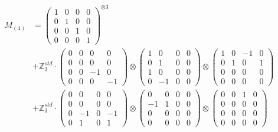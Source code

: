 \documentclass{article}
\newcommand{\Mthree}{%
    M_{(4)}
}
\begin{document}
        \footnotesize{
        \begin{align}
        \Mthree
        &= \label{Rs1-Rc16-Solution-3-c1} \begin{pmatrix} 1 & 0 & 0 & 0 \\ 0 & 1 & 0 & 0 \\ 0 & 0 & 1 & 0 \\ 0 & 0 & 0 & 1 \end{pmatrix}^{\otimes 3} \\
        &+ \label{Rs1-Rc16-Solution-3-c2} \mathbb{Z}_3^{std} \cdot 
            \begin{pmatrix} 0 & 0 & 0 & 0 \\ 0 & 0 & 0 & 0 \\ 0 & 0 & -1 & 0 \\ 0 & 0 & 0 & -1 \end{pmatrix} \otimes 
            \begin{pmatrix} 1 & 0 & 0 & 0 \\ 0 & 1 & 0 & 0 \\ 1 & 0 & 0 & 0 \\ 0 & -1 & 0 & 0 \end{pmatrix} \otimes 
            \begin{pmatrix} 1 & 0 & -1 & 0 \\ 0 & 1 & 0 & 1 \\ 0 & 0 & 0 & 0 \\ 0 & 0 & 0 & 0 \end{pmatrix} \\ 
        &+ \label{Rs1-Rc16-Solution-3-c3} \mathbb{Z}_3^{std} \cdot 
            \begin{pmatrix} 0 & 0 & 0 & 0 \\ 0 & 0 & 0 & 0 \\ 0 & -1 & 0 & -1 \\ 0 & 1 & 0 & 1 \end{pmatrix} \otimes 
            \begin{pmatrix} 0 & 0 & 0 & 0 \\ -1 & 1 & 0 & 0 \\ 0 & 0 & 0 & 0 \\ 0 & 0 & 0 & 0 \end{pmatrix} \otimes 
            \begin{pmatrix} 0 & 0 & 1 & 0 \\ 0 & 0 & 0 & 0 \\ 0 & 0 & 0 & 0 \\ 0 & 0 & 0 & 0 \end{pmatrix} \\ 

\end{align}}
\end{document}

